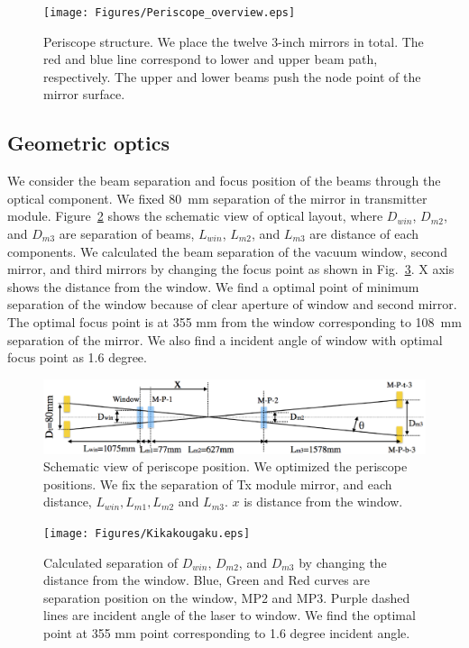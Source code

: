 \begin{figure}
\begin{center}
\texttt{[image: Figures/Periscope\_overview.eps]}
\caption{Periscope structure. We place the twelve 3-inch mirrors in total. The red and blue line correspond to lower and upper beam path, respectively. The upper and lower beams push the node point of the mirror surface.} 
\label{fig:Periscope_overview} 
\end{center}
\end{figure}

\subsection{Geometric optics}
We consider the beam separation and focus position of the beams through the optical component. We fixed 80~mm separation of the mirror in transmitter module.  Figure~\ref{fig:Kikakougaku_position} shows the schematic view of optical layout, where $D_{win}$, $D_{m2}$, and $D_{m3}$ are separation of beams, $L_{win}$, $L_{m2}$, and $L_{m3}$ are distance of each components.  We calculated the beam separation of the vacuum window, second mirror, and third mirrors by changing the focus point as shown in Fig.~\ref{fig:Kikakougaku}. X axis shows the distance from the window. We find a optimal point of minimum separation of the window because of clear aperture of window and second mirror. The optimal focus point is at 355 mm from the window corresponding to 108~mm separation of the mirror. We also find a incident angle of window with optimal focus point as 1.6 degree.




\begin{figure}
\begin{center}
\includegraphics[width=15cm]{Figures/Kikakougaku_position.eps}
\caption{Schematic view of periscope position. We optimized the periscope positions. We fix the separation of Tx module mirror, and each distance, $L_{win}, L_{m1},L_{m2}$ and $L_{m3}$. $x$ is distance from the window.} 
\label{fig:Kikakougaku_position} 
\end{center}
\end{figure}
\begin{figure}
\begin{center}
\texttt{[image: Figures/Kikakougaku.eps]}
\caption{Calculated separation of $D_{win}$, $D_{m2}$, and $D_{m3}$ by changing the distance from the window. Blue, Green and Red curves are separation position on the window, MP2 and MP3. Purple dashed lines are incident angle of the laser to window. We find the optimal point at 355 mm point corresponding to 1.6 degree incident angle.} 
\label{fig:Kikakougaku} 
\end{center}
\end{figure}

